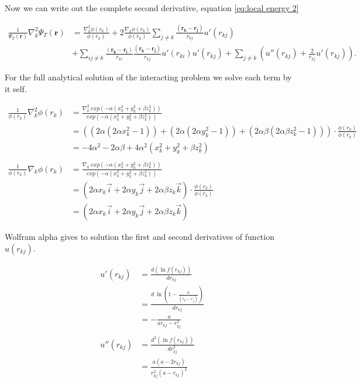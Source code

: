 Now we can write out the complete second derivative, equation \eqref{eq:local energy 2} 

\begin{align*}
\frac{1}{\Psi_T(\mathbf{r})}\nabla_k^2 \Psi_T(\mathbf{r}) &= \frac{\nabla_k^2 \phi(r_k)}{\phi(r_k)} + 2\frac{\nabla_k \phi(r_k)}{\phi(r_k)} \sum_{j \ne k} \frac{(\boldsymbol{r_k} - \boldsymbol{r_j})}{r_{kj}} u'(r_{kj}) \\
&+ \sum_{ij \ne k} \frac{(\boldsymbol{r_k} - \boldsymbol{r_i})}{r_{ki}} \frac{(\boldsymbol{r_k} - \boldsymbol{r_j})}{r_{kj}} u'(r_{ki}) u'(r_{kj}) + \sum_{j \ne k} \left(u''(r_{kj}) + \frac{2}{r_{kj}}u'(r_{kj})\right).
\end{align*}


For the full analytical solution of the interacting problem we solve each term by it self.

\begin{align*}
\frac{1}{\phi(r_k)}\nabla_k^2 \phi(r_k) &= \frac{\nabla_k^2 \ exp(-\alpha(x_k^2 + y_k^2 + \beta z_k^2))}{exp(-\alpha(x_k^2 + y_k^2 + \beta z_k^2))}\\
&= ((2\alpha(2\alpha x_k^2 - 1)) + (2\alpha(2\alpha y_k^2 - 1)) + (2\alpha \beta(2\alpha \beta z_k^2 - 1))) \cdot \frac{\phi(r_k)}{\phi(r_k)}\\
&=-4\alpha^2 - 2\alpha \beta + 4\alpha^2(x_k^2 + y_k^2 + \beta z_k^2)\\ \\
\frac{1}{\phi(r_k)}\nabla_k \phi(r_k) &= \frac{\nabla_k \ exp(-\alpha(x_k^2 + y_k^2 + \beta z_k^2))}{exp(-\alpha(x_k^2 + y_k^2 + \beta z_k^2))}\\
&= (2\alpha x_k \vec{i} + 2\alpha y_k \vec{j} + 2\alpha \beta z_k \vec{k}) \cdot \frac{\phi(r_k)}{\phi(r_k)}\\
&= (2\alpha x_k \vec{i} + 2\alpha y_k \vec{j} + 2\alpha \beta z_k \vec{k})
\end{align*}

Wolfram alpha gives to solution the first and second derivatives of function $u(r_{kj})$.

\begin{align*}
u'(r_{kj}) &= \frac{d (\ln{f(r_{kj})})}{dr_{kj}} \\
&= \frac{d\ \ln{\left(1 - \frac{a}{(r_k - r_j)}\right)}}{dr_{kj}} \\
&= - \frac{a}{ar_{kj} - r_{kj}^2}\\ \\
u''(r_{kj}) &= \frac{d^2 (\ln{f(r_{kj})})}{dr_{kj}^2} \\
&= \frac{a(a - 2r_{kj})}{r_{kj}^2(a - r_{kj})^2}
\end{align*}

